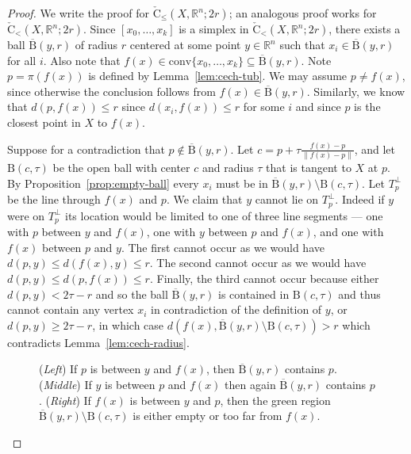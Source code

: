\documentclass{amsart}
\theoremstyle{plain}
\theoremstyle{definition}
\theoremstyle{myremark}
\newcommand{\R}{\mathbb{R}}
\newcommand{\conv}{\mathrm{conv}}
\newcommand{\ball}[2]{\mathrm{B}(#1,#2)}
\newcommand{\cball}[2]{\overline{\mathrm{B}}(#1,#2)}
\newcommand{\cechaleq}[3]{\mathrm{\check{C}_{\le}}(#1,#2;#3)}
\newcommand{\cechaless}[3]{\mathrm{\check{C}_{<}}(#1,#2;#3)}
\begin{document}
\begin{proof}
We write the proof for $\cechaleq{X}{\R^n}{2r}$; an analogous proof works for $\cechaless{X}{\R^n}{2r}$. 
Since $[x_0 , \ldots , x_k]$ is a simplex in $\cechaless{X}{\R^n}{2r}$, there exists a ball $\cball{y}{r}$ of radius $r$ centered at some point $y\in\R^n$ such that $x_i \in \cball{y}{r}$ for all $i$.
Also note that $f(x) \in \conv\{x_0,\ldots,x_k\}\subseteq \cball{y}{r}$.
Note $p=\pi(f(x))$ is defined by Lemma~\ref{lem:cech-tub}.
We may assume $p\neq f(x)$, since otherwise the conclusion follows from $f(x)\in \cball{y}{r}$.
Similarly, we know that $d(p,f(x)) \le r$ since $d(x_i,f(x)) \le r$ for some $i$ and since $p$ is the closest point in $X$ to $f(x)$.

Suppose for a contradiction that $p \notin \cball{y}{r}$.
Let $c=p+\tau\frac{f(x)-p}{\|f(x)-p\|}$, and let $\ball{c}{\tau}$ be the open ball with center $c$ and radius $\tau$ that is tangent to $X$ at $p$.
By Proposition~\ref{prop:empty-ball} every $x_i$ must be in $\cball{y}{r} \setminus \ball{c}{\tau}$.
Let $T_p^{\perp}$ be the line through $f(x)$ and $p$.
We claim that $y$ cannot lie on $T_p^{\perp}$.
Indeed if $y$ were on $T_p^\perp$ its location would be limited to one of three line segments --- one with $p$ between $y$ and $f(x)$, one with $y$ between $p$ and $f(x)$, and one with $f(x)$ between $p$ and $y$.
The first cannot occur as we would have $d(p,y) \le d(f(x),y) \le r$.
The second cannot occur as we would have $d(p,y) \le d(p,f(x)) \le r$.
Finally, the third cannot occur because either $d(p,y) < 2\tau - r$ and so the ball $\cball{y}{r}$ is contained in $\ball{c}{\tau}$ and thus cannot contain any vertex $x_i$ in contradiction of the definition of $y$, or $d(p,y) \ge 2\tau - r$, in which case $d(f(x),\cball{y}{r} \setminus \ball{c}{\tau}) > r$ which contradicts Lemma~\ref{lem:cech-radius}.

\begin{figure}[h]
\def\svgwidth{1.8in}

\hspace{5mm}
\def\svgwidth{1.8in}

\hspace{5mm}
\def\svgwidth{1.8in}

\caption{(\emph{Left}) If $p$ is between $y$ and $f(x)$, then $\cball{y}{r}$ contains $p$.
(\emph{Middle}) If $y$ is between $p$ and $f(x)$ then again $\cball{y}{r}$ contains $p$.
(\emph{Right}) If $f(x)$ is between $y$ and $p$, then the green region $\cball{y}{r} \setminus \ball{c}{\tau}$ is either empty or too far from $f(x)$.}
\end{figure}


\end{proof}
\end{document}
